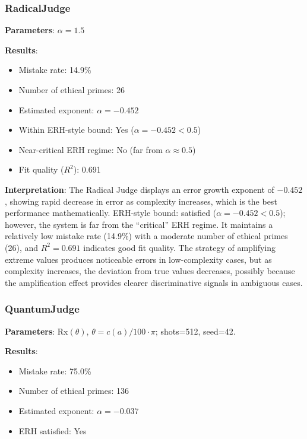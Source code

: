 \documentclass[12pt,a4paper]{article}
\theoremstyle{definition}
\theoremstyle{remark}
\begin{document}
\subsubsection{RadicalJudge}

\textbf{Parameters}: $\alpha = 1.5$

\textbf{Results}:
\begin{itemize}
    \item Mistake rate: 14.9\%
    \item Number of ethical primes: 26
    \item Estimated exponent: $\alpha = -0.452$
    \item Within ERH-style bound: Yes ($\alpha = -0.452 < 0.5$)
    \item Near-critical ERH regime: No (far from $\alpha \approx 0.5$)
    \item Fit quality ($R^2$): 0.691
\end{itemize}

\textbf{Interpretation}: The Radical Judge displays an error growth exponent of $-0.452$, showing rapid decrease in error as complexity increases, which is the best performance mathematically. ERH-style bound: satisfied ($\alpha = -0.452 < 0.5$); however, the system is far from the ``critical'' ERH regime. It maintains a relatively low mistake rate (14.9\%) with a moderate number of ethical primes (26), and $R^2 = 0.691$ indicates good fit quality. The strategy of amplifying extreme values produces noticeable errors in low-complexity cases, but as complexity increases, the deviation from true values decreases, possibly because the amplification effect provides clearer discriminative signals in ambiguous cases.

\subsubsection{QuantumJudge}

\textbf{Parameters}: Rx$(\theta)$, $\theta = c(a)/100 \cdot \pi$; shots=512, seed=42.

\textbf{Results}:
\begin{itemize}
    \item Mistake rate: 75.0\%
    \item Number of ethical primes: 136
    \item Estimated exponent: $\alpha = -0.037$
    \item ERH satisfied: Yes
\end{itemize}
\end{document}

